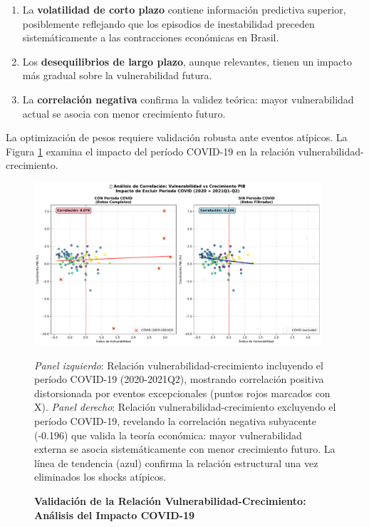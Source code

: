 \documentclass[3p,11pt]{elsarticle}
\begin{document}
\begin{enumerate}
    \item La \textbf{volatilidad de corto plazo} contiene información predictiva superior, posiblemente reflejando que los episodios de inestabilidad preceden sistemáticamente a las contracciones económicas en Brasil.
    \item Los \textbf{desequilibrios de largo plazo}, aunque relevantes, tienen un impacto más gradual sobre la vulnerabilidad futura.
    \item La \textbf{correlación negativa} confirma la validez teórica: mayor vulnerabilidad actual se asocia con menor crecimiento futuro.
\end{enumerate}


La optimización de pesos requiere validación robusta ante eventos atípicos. La Figura 
\ref{fig:covid_analysis} examina el impacto del período COVID-19 en la relación 
vulnerabilidad-crecimiento.

\begin{figure}[htbp]
    \centering
    
    \caption[Análisis de Correlación: Impacto COVID-19]{
        \textbf{Validación de la Relación Vulnerabilidad-Crecimiento: Análisis del Impacto COVID-19}
    }
    
    \vspace{0.5cm}
    
    \includegraphics[width=0.95\textwidth]{../../notebooks/figures/covid_correlation_analysis.pdf}
    
    \vspace{0.3cm}
    
    \parbox{0.95\textwidth}{
        \small
        \textit{Panel izquierdo}: Relación vulnerabilidad-crecimiento incluyendo el período 
        COVID-19 (2020-2021Q2), mostrando correlación positiva distorsionada por eventos 
        excepcionales (puntos rojos marcados con X).
        \textit{Panel derecho}: Relación vulnerabilidad-crecimiento excluyendo el período 
        COVID-19, revelando la correlación negativa subyacente (-0.196) que valida la 
        teoría económica: mayor vulnerabilidad externa se asocia sistemáticamente con 
        menor crecimiento futuro. La línea de tendencia (azul) confirma la relación 
        estructural una vez eliminados los shocks atípicos.
    }
    
    \label{fig:covid_analysis}
\end{figure}
\end{document}

